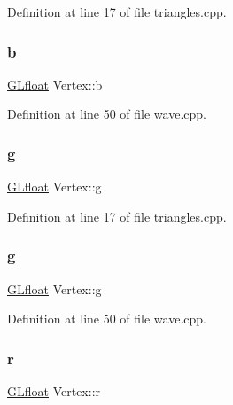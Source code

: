 Definition at line 17 of file triangles.\+cpp.

\mbox{\label{struct_vertex_a0a5270835c4e3bcce9bfc9ba4a069bbb}} 
\subsubsection{\texorpdfstring{b}{b}\hspace{0.1cm}{\footnotesize\ttfamily [2/2]}}
{\footnotesize\ttfamily \mbox{\hyperlink{glad_8h_a836cf6377099e88abf24c255b5b0ac52}{G\+Lfloat}} Vertex\+::b}



Definition at line 50 of file wave.\+cpp.

\mbox{\label{struct_vertex_aaf212b0ecbcbf9c0367ddae30461fd03}} 
\subsubsection{\texorpdfstring{g}{g}\hspace{0.1cm}{\footnotesize\ttfamily [1/2]}}
{\footnotesize\ttfamily \mbox{\hyperlink{glad_8h_a836cf6377099e88abf24c255b5b0ac52}{G\+Lfloat}} Vertex\+::g}



Definition at line 17 of file triangles.\+cpp.

\mbox{\label{struct_vertex_aaf212b0ecbcbf9c0367ddae30461fd03}} 
\subsubsection{\texorpdfstring{g}{g}\hspace{0.1cm}{\footnotesize\ttfamily [2/2]}}
{\footnotesize\ttfamily \mbox{\hyperlink{glad_8h_a836cf6377099e88abf24c255b5b0ac52}{G\+Lfloat}} Vertex\+::g}



Definition at line 50 of file wave.\+cpp.

\mbox{\label{struct_vertex_a0874a00d75d70c7b1e0b57a85297ee3b}} 
\subsubsection{\texorpdfstring{r}{r}\hspace{0.1cm}{\footnotesize\ttfamily [1/2]}}
{\footnotesize\ttfamily \mbox{\hyperlink{glad_8h_a836cf6377099e88abf24c255b5b0ac52}{G\+Lfloat}} Vertex\+::r}



